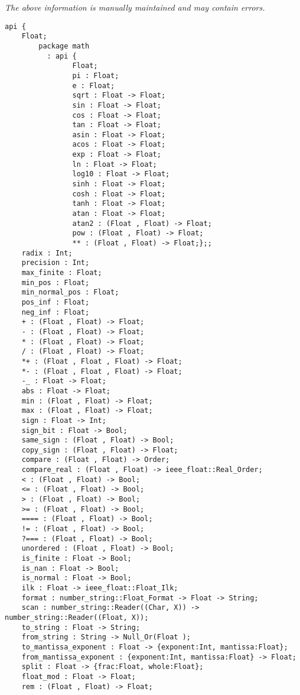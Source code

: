 \label{api:Float}

{\tiny \it The above information is manually maintained and may contain errors.}
\begin{verbatim}
api {
    Float;
        package math
          : api {
                Float;
                pi : Float;
                e : Float;
                sqrt : Float -> Float;
                sin : Float -> Float;
                cos : Float -> Float;
                tan : Float -> Float;
                asin : Float -> Float;
                acos : Float -> Float;
                exp : Float -> Float;
                ln : Float -> Float;
                log10 : Float -> Float;
                sinh : Float -> Float;
                cosh : Float -> Float;
                tanh : Float -> Float;
                atan : Float -> Float;
                atan2 : (Float , Float) -> Float;
                pow : (Float , Float) -> Float;
                ** : (Float , Float) -> Float;};;
    radix : Int;
    precision : Int;
    max_finite : Float;
    min_pos : Float;
    min_normal_pos : Float;
    pos_inf : Float;
    neg_inf : Float;
    + : (Float , Float) -> Float;
    - : (Float , Float) -> Float;
    * : (Float , Float) -> Float;
    / : (Float , Float) -> Float;
    *+ : (Float , Float , Float) -> Float;
    *- : (Float , Float , Float) -> Float;
    -_ : Float -> Float;
    abs : Float -> Float;
    min : (Float , Float) -> Float;
    max : (Float , Float) -> Float;
    sign : Float -> Int;
    sign_bit : Float -> Bool;
    same_sign : (Float , Float) -> Bool;
    copy_sign : (Float , Float) -> Float;
    compare : (Float , Float) -> Order;
    compare_real : (Float , Float) -> ieee_float::Real_Order;
    < : (Float , Float) -> Bool;
    <= : (Float , Float) -> Bool;
    > : (Float , Float) -> Bool;
    >= : (Float , Float) -> Bool;
    ==== : (Float , Float) -> Bool;
    != : (Float , Float) -> Bool;
    ?=== : (Float , Float) -> Bool;
    unordered : (Float , Float) -> Bool;
    is_finite : Float -> Bool;
    is_nan : Float -> Bool;
    is_normal : Float -> Bool;
    ilk : Float -> ieee_float::Float_Ilk;
    format : number_string::Float_Format -> Float -> String;
    scan : number_string::Reader((Char, X)) -> number_string::Reader((Float, X));
    to_string : Float -> String;
    from_string : String -> Null_Or(Float );
    to_mantissa_exponent : Float -> {exponent:Int, mantissa:Float};
    from_mantissa_exponent : {exponent:Int, mantissa:Float} -> Float;
    split : Float -> {frac:Float, whole:Float};
    float_mod : Float -> Float;
    rem : (Float , Float) -> Float;

\end{verbatim}
